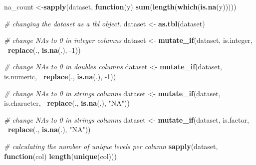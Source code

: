 \documentclass[]{article}
\newenvironment{Shaded}{\begin{snugshade}}{\end{snugshade}}
\newcommand{\CommentTok}[1]{\textcolor[rgb]{0.56,0.35,0.01}{\textit{#1}}}
\newcommand{\ControlFlowTok}[1]{\textcolor[rgb]{0.13,0.29,0.53}{\textbf{#1}}}
\newcommand{\DecValTok}[1]{\textcolor[rgb]{0.00,0.00,0.81}{#1}}
\newcommand{\KeywordTok}[1]{\textcolor[rgb]{0.13,0.29,0.53}{\textbf{#1}}}
\newcommand{\NormalTok}[1]{#1}
\newcommand{\OperatorTok}[1]{\textcolor[rgb]{0.81,0.36,0.00}{\textbf{#1}}}
\newcommand{\StringTok}[1]{\textcolor[rgb]{0.31,0.60,0.02}{#1}}
\begin{document}
\begin{Shaded}
\begin{Highlighting}[]
\NormalTok{  na_count <-}\KeywordTok{sapply}\NormalTok{(dataset, }\ControlFlowTok{function}\NormalTok{(y) }\KeywordTok{sum}\NormalTok{(}\KeywordTok{length}\NormalTok{(}\KeywordTok{which}\NormalTok{(}\KeywordTok{is.na}\NormalTok{(y)))))}
  
  \CommentTok{# changing the dataset as a tbl object.}
\NormalTok{  dataset <-}\StringTok{ }\KeywordTok{as.tbl}\NormalTok{(dataset)}
  
  \CommentTok{# change NAs to 0 in integer columns}
\NormalTok{  dataset <-}\StringTok{ }\KeywordTok{mutate_if}\NormalTok{(dataset, is.integer, }\OperatorTok{~}\KeywordTok{replace}\NormalTok{(., }\KeywordTok{is.na}\NormalTok{(.), }\DecValTok{-1}\NormalTok{))}
  
  \CommentTok{# change NAs to 0 in doubles columns}
\NormalTok{    dataset <-}\StringTok{ }\KeywordTok{mutate_if}\NormalTok{(dataset, is.numeric, }\OperatorTok{~}\KeywordTok{replace}\NormalTok{(., }\KeywordTok{is.na}\NormalTok{(.), }\DecValTok{-1}\NormalTok{))}
  
    \CommentTok{# change NAs to 0 in strings columns}
\NormalTok{    dataset <-}\StringTok{ }\KeywordTok{mutate_if}\NormalTok{(dataset, is.character, }\OperatorTok{~}\KeywordTok{replace}\NormalTok{(., }\KeywordTok{is.na}\NormalTok{(.), }\StringTok{"NA"}\NormalTok{))}
  
  \CommentTok{# change NAs to 0 in strings columns}
\NormalTok{    dataset <-}\StringTok{ }\KeywordTok{mutate_if}\NormalTok{(dataset, is.factor, }\OperatorTok{~}\KeywordTok{replace}\NormalTok{(., }\KeywordTok{is.na}\NormalTok{(.), }\StringTok{"NA"}\NormalTok{))}
  
 
  \CommentTok{# calculating the number of unique levels per column}
  \KeywordTok{sapply}\NormalTok{(dataset, }\ControlFlowTok{function}\NormalTok{(col) }\KeywordTok{length}\NormalTok{(}\KeywordTok{unique}\NormalTok{(col)))}
\end{Highlighting}
\end{Shaded}
\end{document}
